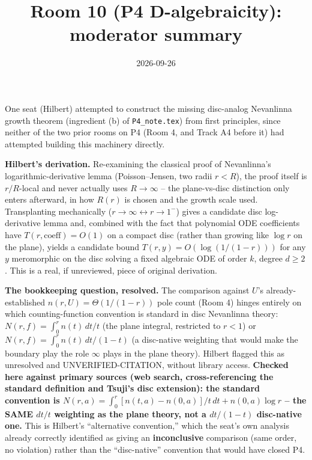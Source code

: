 \documentclass[11pt]{article}
\title{Room 10 (P4 D-algebraicity): moderator summary}
\date{2026-09-26}
\begin{document}
\maketitle

One seat (Hilbert) attempted to construct the missing disc-analog Nevanlinna growth theorem
(ingredient (b) of \texttt{P4\_note.tex}) from first principles, since neither of the two prior
rooms on P4 (Room 4, and Track A4 before it) had attempted building this machinery directly.

\textbf{Hilbert's derivation.} Re-examining the classical proof of Nevanlinna's
logarithmic-derivative lemma (Poisson--Jensen, two radii $r<R$), the proof itself is $r/R$-local
and never actually uses $R\to\infty$ -- the plane-vs-disc distinction only enters afterward, in how
$R(r)$ is chosen and the growth scale used. Transplanting mechanically ($r\to\infty \leftrightarrow
r\to1^-$) gives a candidate disc log-derivative lemma and, combined with the fact that polynomial
ODE coefficients have $T(r,\text{coeff})=O(1)$ on a compact disc (rather than growing like $\log r$
on the plane), yields a candidate bound $T(r,y)=O(\log(1/(1-r)))$ for any $y$ meromorphic on the
disc solving a fixed algebraic ODE of order $k$, degree $d\ge2$. This is a real, if unreviewed,
piece of original derivation.

\textbf{The bookkeeping question, resolved.} The comparison against $U$'s already-established
$n(r,U)=\Theta(1/(1-r))$ pole count (Room 4) hinges entirely on which counting-function convention
is standard in disc Nevanlinna theory: $N(r,f)=\int_0^r n(t)\,dt/t$ (the plane integral, restricted
to $r<1$) or $N(r,f)=\int_0^r n(t)\,dt/(1-t)$ (a disc-native weighting that would make the boundary
play the role $\infty$ plays in the plane theory). Hilbert flagged this as unresolved and
UNVERIFIED-CITATION, without library access. \textbf{Checked here against primary sources (web
search, cross-referencing the standard definition and Tsuji's disc extension): the standard
convention is $N(r,a)=\int_0^r[n(t,a)-n(0,a)]/t\,dt+n(0,a)\log r$ -- the SAME $dt/t$ weighting as
the plane theory, not a $dt/(1-t)$ disc-native one.} This is Hilbert's ``alternative convention,''
which the seat's own analysis already correctly identified as giving an \textbf{inconclusive}
comparison (same order, no violation) rather than the ``disc-native'' convention that would have
closed P4.
\end{document}
